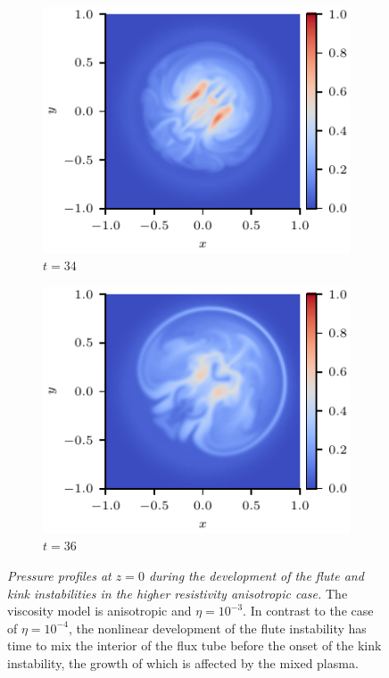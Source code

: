 \documentclass[fleqn,usenatbib]{mnras}
\newcommand{\rs}[2]{{#2}}
\newcommand{\mycaption}[2]{\caption[#1]{\emph{#1} #2}}
\begin{document}
\begin{figure}
\begin{subfigure}{0.32\textwidth}
      \includegraphics[width=\linewidth]{swi-3_pressure_17.pdf}
      \caption{$t=34$}
      \label{fig:swi-3_pressure_17}
    \end{subfigure}
    \hfill
    \begin{subfigure}{0.32\textwidth}
      \includegraphics[width=\linewidth]{swi-3_pressure_18.pdf}
      \caption{$t=36$}
      \label{fig:swi-3_pressure_18}
    \end{subfigure}
\mycaption{Pressure profiles \rs{through}{at} $z=0$ during the development of the \rs{fluting}{flute} and kink instabilities in the higher resistivity \rs{switching}{anisotropic} case.}{The viscosity model is \rs{switching}{anisotropic} and $\eta = 10^{-3}$. In contrast to the case of $\eta=10^{-4}$, the nonlinear development of the \rs{fluting}{flute} instability has time to mix the interior of the flux tube before the onset of the kink instability, the growth of which is affected by the mixed plasma.}
\label{fig:kink_pressure_slices-3}%
\end{figure}
\end{document}
